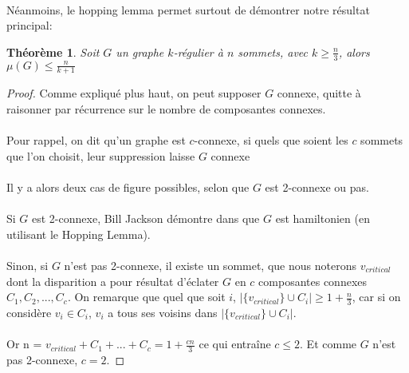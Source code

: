 \documentclass[a4paper]{article}
\newtheorem{theorem}{Théorème}
\theoremstyle{definition}
\theoremstyle{remark}
\begin{document}
\paragraph{}
Néanmoins, le hopping lemma permet surtout de démontrer notre résultat principal:
\begin{theorem}
Soit $G$ un graphe $k$-régulier à $n$ sommets, avec $k \geq \frac{n}{3}$,
alors $\mu(G)\leq \frac{n}{k+1}$
\end{theorem}
\begin{proof}
Comme expliqué plus haut, on peut supposer $G$ connexe, quitte à 
raisonner par récurrence sur le nombre de composantes connexes.


\paragraph{}
Pour rappel, on dit qu'un graphe est $c$-connexe, si quels que soient les
$c$ sommets que l'on choisit, leur suppression laisse $G$ connexe


\paragraph{}
Il y a alors deux cas de figure possibles, selon que $G$ est 2-connexe
ou pas.


\paragraph{}
Si $G$ est 2-connexe, Bill Jackson démontre dans \cite{Jackson} que $G$ 
est hamiltonien (en utilisant le Hopping Lemma).


\paragraph{}
Sinon, si $G$ n'est pas 2-connexe, il existe un sommet, que nous noterons
$v_{critical}$ dont la disparition a pour résultat d'éclater $G$ en $c$ 
composantes connexes $C_{1}, C_{2}, ..., C_{c}$. On remarque que quel 
que soit $i$, $|\{v_{critical}\} \cup C_{i}| \geq 1+\frac{n}{3}$, car si on considère $v_{i} \in C_{i}$, $v_{i}$ a tous ses voisins dans $|\{v_{critical}\} \cup C_{i}|$.

\paragraph{}
Or n = $v_{critical} + C_{1} + ... + C_{c} = 
1 + \frac{cn}{3}$ ce qui entraîne $c \leq 2$. Et comme $G$ n'est pas 2-connexe, $c = 2$.



\end{proof}
\end{document}
